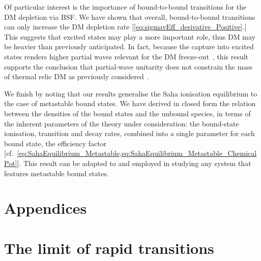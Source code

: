 \documentclass[preprint,5p,twocolumn]{elsarticle}
\begin{document}
Of particular interest is the importance of bound-to-bound transitions for the DM depletion via BSF. We have shown that overall, bound-to-bound transitions can only increase the DM depletion rate [\cref{eq:sigmavEff_derivative_Positive}.]
This suggests that excited states may play a more important role, thus DM may be heavier than previously anticipated.
In fact, because the capture into excited states renders higher partial waves relevant for the DM freeze-out~\cite{Baldes:2017gzw}, this result supports the conclusion that partial-wave unitarity does not constrain the mass of thermal relic DM as previously considered~\cite{Baldes:2017gzw}.

We finish by noting that our results generalise the Saha ionisation equilibrium to the case of metastable bound states. We have derived in closed form the relation between the densities of the bound states and the unbound species, in terms of the inherent parameters of the theory under consideration: the bound-state ionisation, transition and decay rates, combined into a single parameter for each bound state, the efficiency factor [cf.~\cref{eq:SahaEquilibrium_Metastable,eq:SahaEquilibrium_Metastable_ChemicalPot}]. This result can be adapted to and employed in studying any system that features metastable bound states. 




\appendix
\section*{Appendices}


\section{The limit of rapid transitions  \label{App:InverseMatrixM}}
\end{document}
